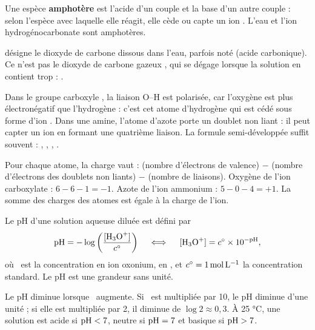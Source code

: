 \begin{definition}
Une espèce \textbf{amphotère} est l'acide d'un couple et la base d'un autre couple : selon
l'espèce avec laquelle elle réagit, elle cède ou capte un ion . L'eau  et
l'ion hydrogénocarbonate  sont amphotères.
\end{definition}
\begin{attention}
 désigne le dioxyde de carbone dissous dans l'eau, parfois noté 
(acide carbonique). Ce n'est pas le dioxyde de carbone gazeux , qui se dégage
lorsque la solution en contient trop : .
\end{attention}
\begin{propriete}
Dans le groupe carboxyle , la liaison O--H est polarisée, car l'oxygène est
plus électronégatif que l'hydrogène : c'est cet atome d'hydrogène qui est cédé sous forme
d'ion . Dans une amine, l'atome d'azote porte un doublet non liant : il peut capter un
ion  en formant une quatrième liaison. La formule semi-développée suffit souvent :
, , , .
\end{propriete}
\begin{savoirfaire}
Pour chaque atome, la charge vaut : (nombre d'électrons de valence) $-$ (nombre d'électrons
des doublets non liants) $-$ (nombre de liaisons).
Oxygène de l'ion carboxylate : $6-6-1=-1$. Azote de l'ion ammonium : $5-0-4=+1$.
La somme des charges des atomes est égale à la charge de l'ion.
\end{savoirfaire}
\begin{definition}[pH]
Le pH d'une solution aqueuse diluée est défini par
\[\pH=-\log\left(\frac{\hho}{\cst}\right)\quad\iff\quad\hho=\cst\times10^{-\pH},\]
où \hho\ est la concentration en ion oxonium, en \molL, et $c^{\circ}=\qty{1}{mol.L^{-1}}$ la
concentration standard. Le pH est une grandeur sans unité.
\end{definition}
\begin{propriete}
Le pH diminue lorsque \hho\ augmente. Si \hho\ est multipliée par 10, le pH diminue d'une
unité ; si elle est multipliée par 2, il diminue de $\log2\approx0{,}3$.
À 25 °C, une solution est acide si $\mathrm{pH}<7$, neutre si $\mathrm{pH}=7$ et basique si $\mathrm{pH}>7$.
\end{propriete}
